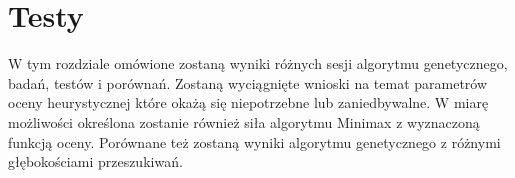 \chapter{Testy}
\thispagestyle{chapterBeginStyle}

{\color{dgray}
W tym rozdziale omówione zostaną wyniki różnych sesji algorytmu genetycznego, badań, testów i porównań. Zostaną wyciągnięte wnioski na temat parametrów oceny heurystycznej które okażą się niepotrzebne lub zaniedbywalne. W miarę możliwości określona zostanie również siła algorytmu Minimax z wyznaczoną funkcją oceny. Porównane też zostaną wyniki algorytmu genetycznego z różnymi głębokościami przeszukiwań.
}


